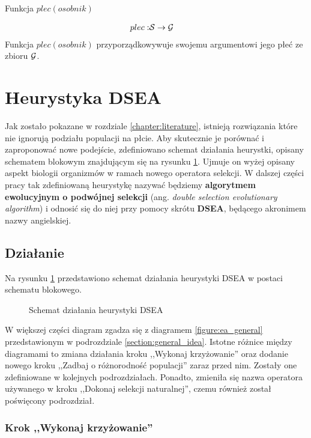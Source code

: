 \documentclass[./FM_mgr.tex]{subfiles}
\begin{document}
\begin{signature}
	\caption{Funkcja $plec(osobnik)$ \label{signature:genderFoo}}
	\begin{align}
	plec: & \mathcal{S} \rightarrow \mathcal{G}
	\end{align}
	Funkcja $plec(osobnik)$ przyporządkowywuje swojemu argumentowi jego płeć ze zbioru $\mathcal{G}$.
\end{signature}

\section{Heurystyka DSEA} \label{section:dsea}

Jak zostało pokazane w rozdziale \ref{chapter:literature}, istnieją rozwiązania które nie ignorują podziału populacji na płcie. 
Aby skutecznie je porównać i zaproponować nowe podejście, zdefiniowano schemat działania heurystki, opisany schematem blokowym znajdującym się na rysunku \ref{figure:dsea}. Ujmuje on wyżej opisany aspekt biologii organizmów w ramach nowego operatora selekcji. 
W dalszej części pracy tak zdefiniowaną heurystykę nazywać będziemy \textbf{algorytmem ewolucyjnym o podwójnej selekcji} (ang. \emph{double selection evolutionary algorithm}) i odnosić się do niej przy pomocy skrótu \textbf{DSEA}, będącego akronimem nazwy angielskiej.

\subsection{Działanie} \label{subsection:dsea_scheme}

Na rysunku \ref{figure:dsea} przedstawiono schemat działania heurystyki DSEA w postaci schematu blokowego. 

\begin{figure}[H]
	\caption{Schemat działania heurystyki DSEA \label{figure:dsea}}
\end{figure}

W większej części diagram zgadza się z diagramem \ref{figure:ea_general} przedstawionym w podrozdziale \ref{section:general_idea}. 
Istotne różnice między diagramami to zmiana działania kroku ,,Wykonaj krzyżowanie'' oraz dodanie nowego kroku ,,Zadbaj o różnorodność populacji'' zaraz przed nim. 
Zostały one zdefiniowane w kolejnych podrozdziałach.
Ponadto, zmieniła się nazwa operatora używanego w kroku ,,Dokonaj selekcji naturalnej'', czemu również został poświęcony podrozdział.

\subsubsection{Krok ,,Wykonaj krzyżowanie''} \label{subsubsection:my_crossover}
\end{document}
